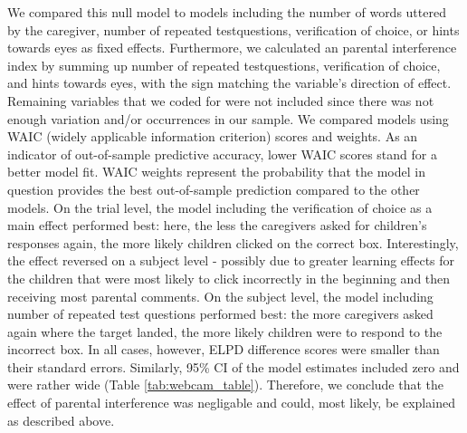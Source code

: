\documentclass[
  man,floatsintext]{apa6}
\begin{document}
We compared this null model to models including the number of words uttered by the caregiver, number of repeated testquestions, verification of choice, or hints towards eyes as fixed effects.
Furthermore, we calculated an parental interference index by summing up number of repeated testquestions, verification of choice, and hints towards eyes, with the sign matching the variable's direction of effect.
Remaining variables that we coded for were not included since there was not enough variation and/or occurrences in our sample.
We compared models using WAIC (widely applicable information criterion) scores and weights.
As an indicator of out-of-sample predictive accuracy, lower WAIC scores stand for a better model fit.
WAIC weights represent the probability that the model in question provides the best out-of-sample prediction compared to the other models.
On the trial level, the model including the verification of choice as a main effect performed best: here, the less the caregivers asked for children's responses again, the more likely children clicked on the correct box.
Interestingly, the effect reversed on a subject level - possibly due to greater learning effects for the children that were most likely to click incorrectly in the beginning and then receiving most parental comments.
On the subject level, the model including number of repeated test questions performed best: the more caregivers asked again where the target landed, the more likely children were to respond to the incorrect box.
In all cases, however, ELPD difference scores were smaller than their standard errors.
Similarly, 95\% CI of the model estimates included zero and were rather wide (Table \ref{tab:webcam_table}).
Therefore, we conclude that the effect of parental interference was negligable and could, most likely, be explained as described above.
\end{document}

